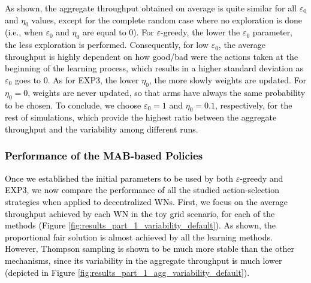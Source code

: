 \documentclass{article}
\begin{document}
	\textcolor{black}{As shown, the aggregate throughput obtained on average is quite similar for all $\varepsilon_0$ and $\eta_0$ values, except for the complete random case where no exploration is done (i.e., when $\varepsilon_0$ and $\eta_0$ are equal to 0). For $\varepsilon$-greedy, the lower the $\varepsilon_0$ parameter, the less exploration is performed. Consequently, for low $\varepsilon_0$, the average throughput is highly dependent on how good/bad were the actions taken at the beginning of the learning process, which results in a higher standard deviation as $\varepsilon_0$ goes to 0. As for EXP3, the lower $\eta_0$, the more slowly weights are updated. For $\eta_0 = 0$, weights are never updated, so that arms have always the same probability to be chosen. To conclude, we choose $\varepsilon_0 = 1$ and $\eta_0 = 0.1$, respectively, for the rest of simulations, which provide the highest ratio between the aggregate throughput and the variability among different runs.}
	
	\textcolor{black}{\subsubsection{Performance of the MAB-based Policies}}
	
	\textcolor{black}{Once we established the initial parameters to be used by both $\varepsilon$-greedy and EXP3, we now compare the performance of all the studied action-selection strategies when applied to decentralized WNs. First, we focus on the average throughput achieved by each WN in the toy grid scenario, for each of the methods (Figure \ref{fig:results_part_1_variability_default}). As shown, the proportional fair solution is almost achieved by all the learning methods. However, Thompson sampling is shown to be much more stable than the other mechanisms, since its variability in the aggregate throughput is much lower (depicted in Figure \ref{fig:results_part_1_agg_variability_default}).}
	
\end{document}
